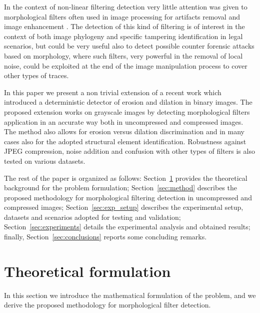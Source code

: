 \documentclass{ieeeaccess}
\begin{document}
In the context of non-linear filtering detection 
very little attention was given to morphological filters \cite{haas1967morphologie} often used in image processing for artifacts removal and image enhancement \cite{British2012} \cite{Maragos2004}. The detection of this kind of filtering is of interest in the context of both image phylogeny and specific tampering identification in legal scenarios, but could be very useful also to detect possible counter forensic attacks based on morphology, where such filters, very powerful in the removal of local noise, could be exploited at the end of the image manipulation process to cover other types of traces. 

In this paper we present a non trivial extension of a recent work \cite{de2017detecting} which introduced a deterministic detector of erosion and dilation in binary images. The proposed extension works on grayscale images by detecting morphological filters application in an accurate way both in uncompressed and compressed images. The method also allows for erosion versus dilation discrimination and in many cases also for the adopted structural element identification. 
Robustness against JPEG compression, noise addition and confusion with other types of filters is also tested on various datasets. 

The rest of the paper is organized as follows: Section~\ref{sec:theory} provides the theoretical background for the problem formulation; Section~\ref{sec:method} describes the proposed methodology for morphological filtering detection in uncompressed and compressed images; Section~\ref{sec:exp_setup} describes the experimental setup, datasets and scenarios adopted for testing and validation; Section~\ref{sec:experiments} details the experimental analysis and obtained results; finally, Section~\ref{sec:conclusions} reports some concluding remarks.   

\section{Theoretical formulation}
\label{sec:theory}
In this section we introduce the mathematical formulation of the problem, and we derive the proposed methodology for morphological filter detection. 
\end{document}
